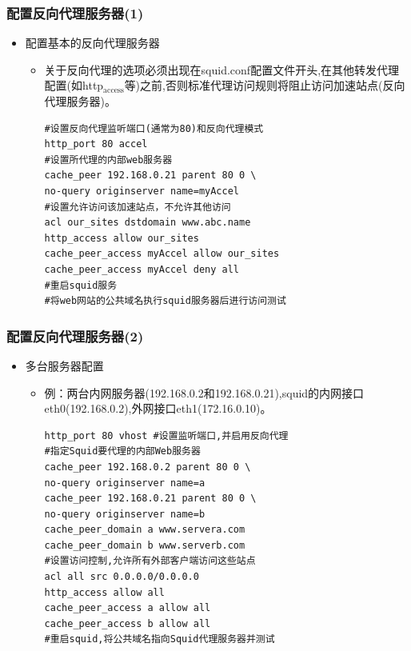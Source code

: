 \documentclass[xcolor=svgnames,presentation]{beamer}
\begin{document}
\begin{frame}[fragile]
\frametitle{配置反向代理服务器(1)}
\label{sec-4-19}
\begin{itemize}

\item 配置基本的反向代理服务器
\label{sec-4-19-1}%
\begin{itemize}

\item 关于反向代理的选项必须出现在squid.conf配置文件开头,在其他转发代理配置(如http$_{\mathrm{access}}$等)之前,否则标准代理访问规则将阻止访问加速站点(反向代理服务器)。\\
\label{sec-4-19-1-1}%
\begin{verbatim}
#设置反向代理监听端口(通常为80)和反向代理模式
http_port 80 accel
#设置所代理的内部web服务器
cache_peer 192.168.0.21 parent 80 0 \
no-query originserver name=myAccel
#设置允许访问该加速站点，不允许其他访问
acl our_sites dstdomain www.abc.name
http_access allow our_sites
cache_peer_access myAccel allow our_sites
cache_peer_access myAccel deny all
#重启squid服务
#将web网站的公共域名执行squid服务器后进行访问测试
\end{verbatim}
\end{itemize} %
\end{itemize} %
\end{frame}
\begin{frame}[fragile]
\frametitle{配置反向代理服务器(2)}
\label{sec-4-20}
\begin{itemize}

\item 多台服务器配置
\label{sec-4-20-1}%
\begin{itemize}

\item 例：两台内网服务器(192.168.0.2和192.168.0.21),squid的内网接口eth0(192.168.0.2),外网接口eth1(172.16.0.10)。\\
\label{sec-4-20-1-1}%
\begin{verbatim}
http_port 80 vhost #设置监听端口,并启用反向代理
#指定Squid要代理的内部Web服务器
cache_peer 192.168.0.2 parent 80 0 \
no-query originserver name=a
cache_peer 192.168.0.21 parent 80 0 \
no-query originserver name=b
cache_peer_domain a www.servera.com
cache_peer_domain b www.serverb.com
#设置访问控制,允许所有外部客户端访问这些站点
acl all src 0.0.0.0/0.0.0.0
http_access allow all
cache_peer_access a allow all
cache_peer_access b allow all
#重启squid,将公共域名指向Squid代理服务器并测试
\end{verbatim}
\end{itemize} %
\end{itemize} %
\end{frame}
\end{document}
